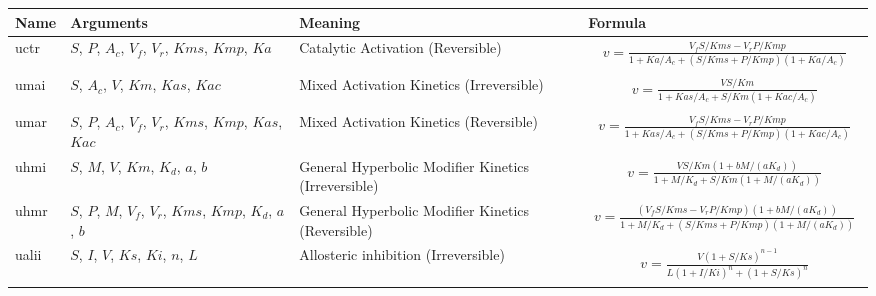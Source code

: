 \documentclass[10pt]{cek-article}
\begin{document}
\addtocounter{table}{-1}
\begin{table}[ht]
\setlength{\abovedisplayskip}{-2pt}
\setlength{\belowdisplayskip}{1pt}
\begin{tabular}{|p{0.4in}|>{\raggedright}m{0.77in}|>{\raggedright}m{1.3in}|m{3.4in}|}
\hline
\textbf{Name} & \textbf{Arguments} & \textbf{Meaning} &
\textbf{Formula} \\
\hline

uctr & $S$, $P$, $A_c$, $V_f$, $V_r$, $Kms$, $Kmp$, $Ka$ &
Catalytic Activation (Reversible) &
\begin{gather*}
v = \frac{V_f S/Kms - V_r P/Kmp}{1 +
Ka/A_c + \left( S/Kms + P/Kmp\right) \left( 1 + Ka/A_c\right)}
\end{gather*}
\\ \hline

umai & $S$, $A_c$, $V$, $Km$, $Kas$, $Kac$ & Mixed Activation
Kinetics (Irreversible) &
\begin{gather*}
v = \frac{V S/Km}{1 + Kas/A_c + S/Km \left( 1 + Kac/A_c\right)}
\end{gather*}
\\ \hline

umar & $S$, $P$, $A_c$, $V_f$, $V_r$, $Kms$, $Kmp$, $Kas$, $Kac$ &
Mixed Activation Kinetics (Reversible) &
\begin{gather*}
v = \frac{V_f S/Kms - V_r P/Kmp}{1 + Kas/A_c + \left( S/Kms +
    P/Kmp\right) \left( 1 + Kac/A_c\right)}
\end{gather*}
\\ \hline

uhmi & $S$, $M$, $V$, $Km$, $K_d$, $a$, $b$ & General Hyperbolic
Modifier Kinetics (Irreversible) &
\begin{gather*}
v = \frac{V S/Km \left( 1 + b
M / (a K_d)\right) }{1 + M/K_d + S/Km \left( 1 + M/(a K_d)\right)}
\end{gather*}
\\ \hline

uhmr & $S$, $P$, $M$, $V_f$, $V_r$, $Kms$, $Kmp$, $K_d$, $a$, $b$ &
General Hyperbolic Modifier Kinetics (Reversible) &
\begin{gather*}
v = \frac{\left( V_f S/Kms - V_r P/Kmp\right) \left( 1 + b M / (a
K_d)\right) }{1 + M/K_d + \left( S/Kms + P/Kmp \right) \left( 1 +
M/(a K_d)\right)}
\end{gather*}
\\ \hline

ualii & $S$, $I$, $V$, $Ks$, $Ki$, $n$, $L$ & Allosteric inhibition
(Irreversible) &
\begin{gather*}
v = \frac{V \left( 1 + S/Ks\right)^{n-1}}{L \left(
1 + I/Ki\right)^n + \left( 1 + S/Ks \right)^n}
\end{gather*}
\\ \hline


\end{tabular}
\end{table}
\end{document}

